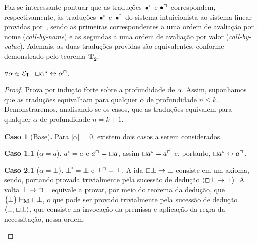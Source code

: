     Faz-se interessante pontuar que as traduções $\bullet^\circ$ e $\bullet^\Box$ correspondem, respectivamente, às traduções $\bullet^\circ$ e $\bullet^*$ do sistema intuicionista ao sistema linear providas por~\cite{Girard}, sendo as primeiras correspondentes a uma ordem de avaliação por nome (\textit{call-by-name}) e as segundas a uma ordem de avaliação por valor (\textit{call-by-value}). 
    Ademais, as duas traduções providas são equivalentes, conforme demonstrado pelo teorema $\mathbf{T_2}$.

    \begin{theorem}
        $\forall\alpha\in\mathcal{L}_\mathbf{I}\mathrel{.}\Box\alpha^\circ\leftrightarrow\alpha^\Box$.

        \begin{proof}
            Prova por indução forte sobre a profundidade de $\alpha$.
            Assim, suponhamos que as traduções equivalham para qualquer $\alpha$ de profundidade $n\leq k$.
            Demonstraremos, analisando-se os casos, que as traduções equivalem para qualquer $\alpha$ de profundidade $n=k+1$.
    
            \begin{case}
                \textbf{Caso 1} (Base)\textbf{.}
                    Para $|\alpha| = 0$, existem dois casos a serem considerados.
    
                    \begin{subcase}
                        \textbf{Caso 1.1} ($\alpha = a$)\textbf{.}
                        $a^\circ = a$ e $a^\Box = \Box a$, assim $\Box a^\circ = a^\Box$ e, portanto, $\Box a^\circ \leftrightarrow a^\Box$.
                    \end{subcase}

                    \begin{subcase}
                        \textbf{Caso 2.1} ($\alpha = \bot$)\textbf{.}
                        $\bot^\circ = \bot$ e $\bot^\Box = \bot$. A ida $\Box\bot\to\bot$ consiste em um axioma, sendo, portando provada trivialmente pela sucessão de dedução $\langle\Box\bot\to\bot\rangle$.
                        A volta $\bot\to\Box\bot$ equivale a provar, por meio do teorema da dedução, que $\left\{\bot\right\}\vdash_\mathbf{M}\Box\bot$, o que pode ser provado trivialmente pela sucessão de dedução $\langle\bot, \Box\bot\rangle$, que consiste na invocação da premissa e aplicação da regra da necessitação, nessa ordem.
                    \end{subcase}
            \end{case}
    

\end{proof}
\end{theorem}

